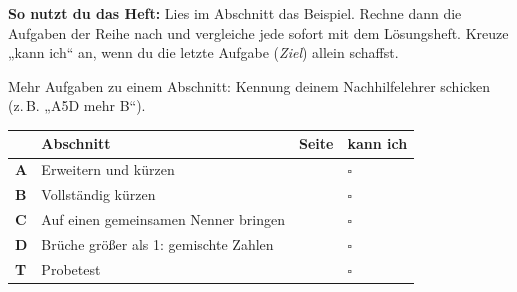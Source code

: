 \documentclass[11pt]{article}
\begin{document}
\par\smallskip
{}\par\medskip
\noindent\textbf{So nutzt du das Heft:} Lies im Abschnitt das Beispiel. Rechne dann die Aufgaben der Reihe nach und vergleiche jede sofort mit dem Lösungsheft. Kreuze „kann ich“ an, wenn du die letzte Aufgabe (\emph{Ziel}) allein schaffst.\par
\noindent Mehr Aufgaben zu einem Abschnitt: Kennung deinem Nachhilfelehrer schicken (z.\,B. „A5D mehr B“).\par\medskip
{\renewcommand{\arraystretch}{1.3}
\noindent\begin{tabular}{|>{\bfseries}p{10mm}|p{112mm}|>{\raggedleft\arraybackslash}p{10mm}|>{\centering\arraybackslash}p{14mm}|}\hline
\rowcolor{black!8} & \textbf{Abschnitt} & \textbf{Seite} & \textbf{kann ich}\\\hline
A & Erweitern und kürzen & \pageref{s:A} & $\square$\\\hline
B & Vollständig kürzen & \pageref{s:B} & $\square$\\\hline
C & Auf einen gemeinsamen Nenner bringen & \pageref{s:C} & $\square$\\\hline
D & Brüche größer als 1: gemischte Zahlen & \pageref{s:D} & $\square$\\\hline
T & Probetest & \pageref{s:T} & $\square$\\\hline
\end{tabular}}\par\bigskip
\end{document}
